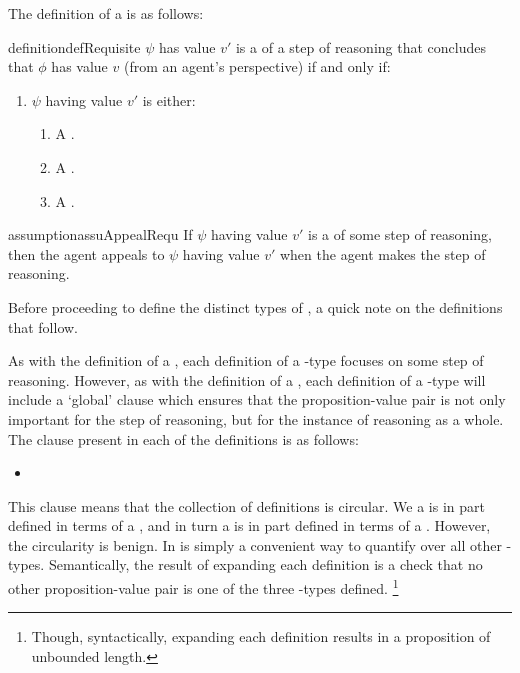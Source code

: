 \begin{note}
  The definition of a \requ{} is as follows:
  \begin{restatable}{definition}{defRequisite}
    \label{def:requsite}
    \(\psi\) has value \(v'\) is a \emph{\requ{}} of a step of reasoning that concludes that \(\phi\) has value \(v\) (from an agent's perspective) if and only if:
    \begin{enumerate}[label=\arabic*., ref=\named{R:\arabic*}]
    \item[] \(\psi\) having value \(v'\) is either:
      \begin{enumerate}
      \item
        A \prequ{}.
      \item
        A \crequ{}.
      \item
        A \cprequ{}.
      \end{enumerate}
      \vspace{-\baselineskip}
    \end{enumerate}
    \vspace{-\baselineskip}
  \end{restatable}
\end{note}

\begin{restatable}{assumption}{assuAppealRequ}
  If \(\psi\) having value \(v'\) is a  of some step of reasoning, then the agent appeals to \(\psi\) having value \(v'\) when the agent makes the step of reasoning.
\end{restatable}

\begin{note}
  Before proceeding to define the distinct types of \requ{}, a quick note on the definitions that follow.

  As with the definition of a \result{}, each definition of a \requ{}-type focuses on some step of reasoning.
  However, as with the definition of a \result{}, each definition of a \requ{}-type will include a `global' clause which ensures that the proposition-value pair is not only important for the step of reasoning, but for the instance of reasoning as a whole.
  The clause present in each of the definitions is as follows:
  \begin{itemize}
  \item
    \requGlobalClause{}
  \end{itemize}
  This clause means that the collection of definitions is circular.
  We a \requ{} is in part defined in terms of a \prequ{}, and in turn a \prequ{} is in part defined in terms of a \requ{}.
  However, the circularity is benign.
  In is simply a convenient way to quantify over all other \requ{}-types.
  Semantically, the result of expanding each definition is a check that no other proposition-value pair is one of the three \requ{}-types defined.\nolinebreak
  \footnote{
    Though, syntactically, expanding each definition results in a proposition of unbounded length.
  }
\end{note}

